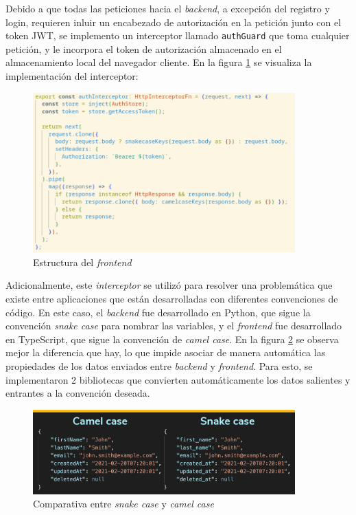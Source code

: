 Debido a que todas las peticiones hacia el \textit{backend}, a excepción del registro y login, requieren inluir un encabezado de autorización en la petición junto con el token JWT, se implemento un interceptor llamado \texttt{authGuard} que toma cualquier petición, y le incorpora el token de autorización almacenado en el almacenamiento local del navegador cliente. En la figura \ref{frontend:interceptor} se visualiza la implementación del interceptor:

\begin{figure}[H]
	\centering
	\includegraphics[width=0.9\textwidth]{./Figures/frontend-interceptor.png}
	\caption{Estructura del \textit{frontend}}
	\label{frontend:interceptor}
\end{figure}

Adicionalmente, este \textit{interceptor} se utilizó para resolver una problemática que existe entre aplicaciones que están desarrolladas con diferentes convenciones de código. En este caso, el \textit{backend} fue desarrollado en Python, que sigue la convención \textit{snake case} para nombrar las variables, y el \textit{frontend} fue desarrollado en TypeScript, que sigue la convención de \textit{camel case}\citep{CODE:1}. En la figura \ref{frontend:snake-case} se observa mejor la diferencia que hay, lo que impide asociar de manera automática las propiedades de los datos enviados entre \textit{backend} y \textit{frontend}. Para esto, se implementaron 2 bibliotecas que convierten automáticamente los datos salientes y entrantes a la convención deseada.

\begin{figure}[H]
	\centering
	\includegraphics[width=0.9\textwidth]{./Figures/snake-case.png}
	\caption{Comparativa entre \textit{snake case} y \textit{camel case}}
	\label{frontend:snake-case}
\end{figure}


